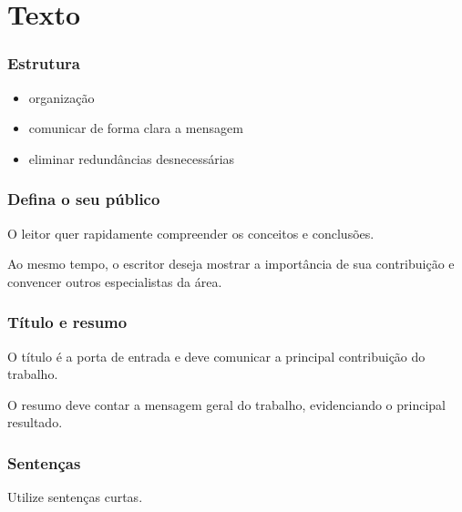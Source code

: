 \section{Texto}
\begin{frame}
\frametitle{Estrutura}
\begin{itemize}
\item<2-> organização
\item<3-> comunicar de forma clara a mensagem
\item<4-> eliminar redundâncias desnecessárias
\end{itemize}
\end{frame}

\begin{frame}
\frametitle{Defina o seu público}
O leitor quer rapidamente compreender os conceitos e conclusões.

Ao mesmo tempo, o escritor deseja mostrar a importância de sua contribuição e
convencer outros especialistas da área.
\end{frame}

\begin{frame}
\frametitle{Título e resumo}
O título é a porta de entrada e deve comunicar a principal contribuição do trabalho.

\vspace{3em}
O resumo deve contar a mensagem geral do trabalho, evidenciando o principal resultado.
\end{frame}

\begin{frame}
\frametitle{Sentenças}
Utilize sentenças curtas.
\end{frame}

